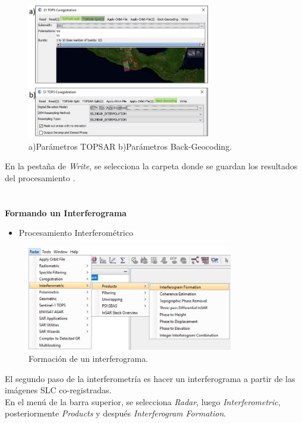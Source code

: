 \documentclass{article}
\begin{document}
    \begin{figure}[htbp]
    \centering
    \includegraphics[width=8cm]{Imagen/05.JPG}
    \caption{a)Parámetros TOPSAR  b)Parámetros Back-Geocoding. }
    \label{fig:05}
    \end{figure}
    En la pestaña de \textit{Write}, se selecciona  la carpeta donde se guardan los resultados del procesamiento .\\ \\ \\
\textbf{Formando un Interferograma}\\
\begin{itemize}
    \item Procesamiento Interferométrico
\end{itemize}
    \begin{figure}[htbp]
    \centering
    \includegraphics[width=9cm]{Imagen/06.JPG}
    \caption{Formación de un interferograma.}
    \label{fig:06}
    \end{figure}
    El segundo paso de la interferometría es hacer un interferograma a partir de las imágenes SLC co-registradas.\\
    En el menú de la barra superior, se selecciona \textit{Radar}, luego \textit{Interferometric}, posteriormente \textit{Products} y después \textit{Interferogram Formation}.\\
\end{document}
